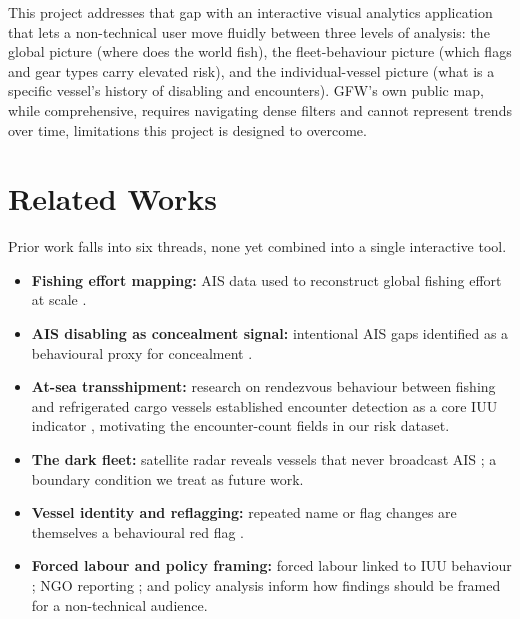 \documentclass[sigconf]{acmart}
\begin{document}
This project addresses that gap with an interactive visual analytics application that lets a non-technical user move fluidly between three levels of analysis: the global picture (where does the world fish), the fleet-behaviour picture (which flags and gear types carry elevated risk), and the individual-vessel picture (what is a specific vessel's history of disabling and encounters). GFW's own public map, while comprehensive, requires navigating dense filters and cannot represent trends over time, limitations this project is designed to overcome.

\section{Related Works}
Prior work falls into six threads, none yet combined into a single interactive tool.
\begin{itemize}
    \item \textbf{Fishing effort mapping:} AIS data used to reconstruct global fishing effort at scale \cite{Kroodsma2018}.
    \item \textbf{AIS disabling as concealment signal:} intentional AIS gaps identified as a behavioural proxy for concealment \cite{Welch2022}.
    \item \textbf{At-sea transshipment:} research on rendezvous behaviour between fishing and refrigerated cargo vessels established encounter detection as a core IUU indicator \cite{Miller2018}, motivating the encounter-count fields in our risk dataset.
    \item \textbf{The dark fleet:} satellite radar reveals vessels that never broadcast AIS \cite{Paolo2024}; a boundary condition we treat as future work.
    \item \textbf{Vessel identity and reflagging:} repeated name or flag changes are themselves a behavioural red flag \cite{Park2023}.
    \item \textbf{Forced labour and policy framing:} forced labour linked to IUU behaviour \cite{Selig2022}; NGO reporting \cite{EJF}; \cite{Oceana} and policy analysis \cite{LimJung2025} inform how findings should be framed for a non-technical audience.
\end{itemize}
\end{document}
